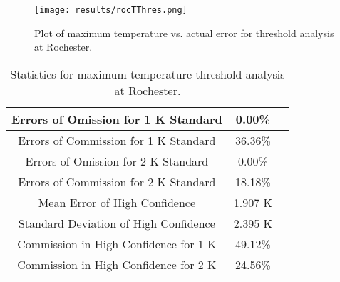 \documentclass{book}
\begin{document}
\begin{minipage}[c]{0.47\textwidth}
\centering
\begin{figure}[H]
\texttt{[image: results/rocTThres.png]}
\caption{Plot of maximum temperature vs. actual error for threshold analysis at Rochester.}
\label{fig:rocTThres}
\end{figure}
\end{minipage}
\begin{minipage}[c]{0.47\textwidth}
\begin{table}[H]
\centering
\footnotesize
\begin{tabular}{ | c | c | c | } \hline
Errors of Omission for 1 K Standard & 0.00\% \\ \hline
Errors of Commission for 1 K Standard & 36.36\% \\ \hline
Errors of Omission for 2 K Standard & 0.00\% \\ \hline
Errors of Commission for 2 K Standard & 18.18\% \\ \hline
Mean Error of High Confidence & 1.907 K \\ \hline
Standard Deviation of High Confidence & 2.395 K \\ \hline
Commission in High Confidence for 1 K & 49.12\% \\ \hline
Commission in High Confidence for 2 K & 24.56\% \\ \hline
\end{tabular}
\caption{Statistics for maximum temperature threshold analysis at Rochester.}
\label{tab:rocTThres}
\end{table}
\end{minipage}
\end{document}
